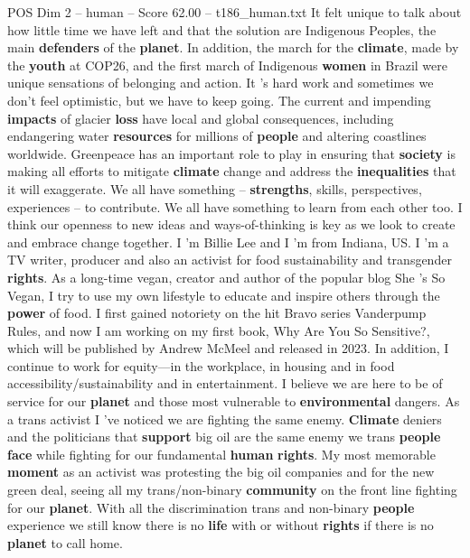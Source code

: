 \begin{textsample}{POS Dim 2 – human – Score 62.00 – t186\_human.txt}
It felt unique to talk about how little time we have left and that the solution are Indigenous Peoples, the main \textbf{defenders} of the \textbf{planet}.
In addition, the march for the \textbf{climate}, made by the \textbf{youth} at COP26, and the first march of Indigenous \textbf{women} in Brazil were unique sensations of belonging and action.
It ’s hard work and sometimes we don't feel optimistic, but we have to keep going.
The current and impending \textbf{impacts} of glacier \textbf{loss} have local and global consequences, including endangering water \textbf{resources} for millions of \textbf{people} and altering coastlines worldwide.
Greenpeace has an important role to play in ensuring that \textbf{society} is making all efforts to mitigate \textbf{climate} change and address the \textbf{inequalities} that it will exaggerate.
We all have something – \textbf{strengths}, skills, perspectives, experiences – to contribute.
We all have something to learn from each other too.
I think our openness to new ideas and ways-of-thinking is key as we look to create and embrace change together.
I ’m Billie Lee and I ’m from Indiana, US.
I ’m a TV writer, producer and also an activist for food sustainability and transgender \textbf{rights}.
As a long-time vegan, creator and author of the popular blog She ’s So Vegan, I try to use my own lifestyle to educate and inspire others through the \textbf{power} of food.
I first gained notoriety on the hit Bravo series Vanderpump Rules, and now I am working on my first book, Why Are You So Sensitive?, which will be published by Andrew McMeel and released in 2023.
In addition, I continue to work for equity—in the workplace, in housing and in food accessibility/sustainability and in entertainment.
I believe we are here to be of service for our \textbf{planet} and those most vulnerable to \textbf{environmental} dangers.
As a trans activist I ’ve noticed we are fighting the same enemy. \textbf{Climate} deniers and the politicians that \textbf{support} big oil are the same enemy we trans \textbf{people} \textbf{face} while fighting for our fundamental \textbf{human} \textbf{rights}.
My most memorable \textbf{moment} as an activist was protesting the big oil companies and for the new green deal, seeing all my trans/non-binary \textbf{community} on the front line fighting for our \textbf{planet}.
With all the discrimination trans and non-binary \textbf{people} experience we still know there is no \textbf{life} with or without \textbf{rights} if there is no \textbf{planet} to call home.

\end{textsample}
